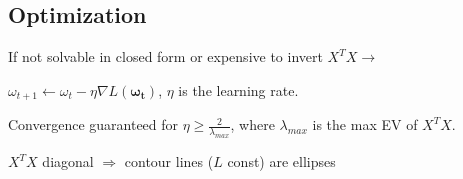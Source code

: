 \subsection{Optimization}

    If not solvable in closed form or expensive to invert $X^TX\rightarrow$
    
    $\omega_{t+1} \leftarrow \omega_t - \eta \nabla L(\boldsymbol{\omega_t})$, $\eta$ is the learning rate.
    
    Convergence guaranteed for $\eta \geq \frac{2}{\lambda_{max}}$, where $\lambda_{max}$ is the max EV of $X^TX$. 
    
    $X^TX$ diagonal $\Rightarrow$ contour lines ($L$ const) are ellipses
    
    